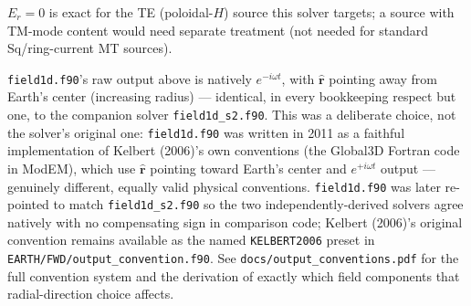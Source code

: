 \documentclass[11pt]{article}
\newcommand{\rhat}{\hat{\mathbf r}}
\begin{document}
$E_r=0$ is exact for the TE (poloidal-$H$) source this solver targets; a source with TM-mode
content would need separate treatment (not needed for standard Sq/ring-current MT sources).

\texttt{field1d.f90}'s raw output above is natively $e^{-i\omega t}$, with $\rhat$ pointing away
from Earth's center (increasing radius) --- identical, in every bookkeeping respect but one, to
the companion solver \texttt{field1d\_s2.f90}. This was a deliberate choice, not the solver's
original one: \texttt{field1d.f90} was written in 2011 as a faithful implementation of Kelbert
(2006)'s own conventions (the Global3D Fortran code in ModEM), which use $\rhat$ pointing toward
Earth's center and $e^{+i\omega t}$ output --- genuinely different, equally valid physical
conventions. \texttt{field1d.f90} was later re-pointed to match \texttt{field1d\_s2.f90} so the
two independently-derived solvers agree natively with no compensating sign in comparison code;
Kelbert (2006)'s original convention remains available as the named \texttt{KELBERT2006} preset
in \texttt{EARTH/FWD/output\_convention.f90}. See \texttt{docs/output\_conventions.pdf} for the
full convention system and the derivation of exactly which field components that
radial-direction choice affects.
\end{document}

